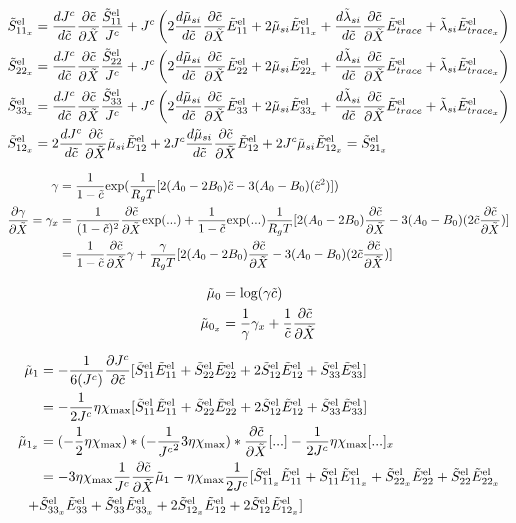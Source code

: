 \documentclass[../main.tex]{subfiles}
\begin{document}
\begin{align}
    \tSel{11_x} &= \djc \tcx \fc{\tSel{11}}{\jc} + \jc \left(  2 \fc{d \td{\mu}_{si}}{d \td c} \tcx \tEel{11} + 2 \td{\mu}_{si} \tEel{11_x} + \fc{d \td {\lambda}_{si}}{d \td {c}} \tcx \tEel{trace} + \td{\lambda}_{si} \tEel{trace_x} \right) \\
    \tSel{22_x} &= \djc \tcx \fc{\tSel{22}}{\jc} + \jc \left(  2 \fc{d \td{\mu}_{si}}{d \td c} \tcx \tEel{22} + 2 \td{\mu}_{si} \tEel{22_x} + \fc{d \td {\lambda}_{si}}{d \td {c}} \tcx \tEel{trace} + \td{\lambda}_{si} \tEel{trace_x} \right) \\
    \tSel{33_x} &= \djc \tcx \fc{\tSel{33}}{\jc} + \jc \left(  2 \fc{d \td{\mu}_{si}}{d \td c} \tcx \tEel{33} + 2 \td{\mu}_{si} \tEel{33_x} + \fc{d \td {\lambda}_{si}}{d \td {c}} \tcx \tEel{trace} + \td{\lambda}_{si} \tEel{trace_x} \right) \\
    \tSel{12_x} &= 2 \djc \tcx \td{\mu}_{si}\tEel{12} + 2 \jc \fc{d\td{\mu}_{si}}{d \tc} \tcx \tEel{12} + 2 \jc \td{\mu}_{si}\tEel{12_x} = \tSel{21_x}
\end{align}

\begin{align}
    \gamma &= \fc{1}{1-\td{c}}\text{exp}(\fc{1}{R_g T}[2(A_0 - 2B_0)\td{c} - 3(A_0 - B_0)(\td{c}^2)])\\
    \pdiff{\gamma}{\tX} = \gamma_x &= \fc{1}{(1-\tc)^2} \tcx \text{exp}(...) + \fc{1}{1-\tc}\text{exp}(...)\fc{1}{R_g T}[2(A_0 - 2B_0)\tcx - 3(A_0 - B_0)(2\tc \tcx)] \\
    &= \fc{1}{1-\tc}\tcx \gamma + \fc{\gamma}{R_g T}[2(A_0 - 2B_0)\tcx - 3(A_0 - B_0)(2\tc \tcx)]\\
\end{align}

\begin{align}
    \td{\mu}_0 &= \text{log}(\gamma \td{c}) \\
    \td{\mu}_{0_x} &= \fc{1}{\gamma}\gamma_x + \fc{1}{\tc}\tcx
\end{align}


\begin{align}
     \td{\mu}_1 &= -\fc{1}{6(\jc)}\pdiff{ \jc}{\tc} [\tSel{11}\tEel{11} + \tSel{22}\tEel{22} + 2\tSel{12}\tEel{12} + \tSel{33}\tEel{33}] \\
    &= -\fc{1}{2\jc}\eta\xmax [\tSel{11}\tEel{11} + \tSel{22}\tEel{22} + 2\tSel{12}\tEel{12} + \tSel{33}\tEel{33}] \\
    \td{\mu}_{1_x} &= (-\fc{1}{2}\eta\xmax)*(-\fc{1}{\jc^2} 3 \eta \xmax)* \tcx [...] -\fc{1}{2\jc}\eta\xmax [...]_x\\
    &= -3\eta\xmax \fc{1}{\jc} \tcx \td{\mu}_{1} - \eta \xmax \fc{1}{2 \jc}[\tSel{11_x}\tEel{11} + \tSel{11}\tEel{11_x} + \tSel{22_x}\tEel{22} + \tSel{22}\tEel{22_x}  \\ +&\tSel{33_x}\tEel{33} + \tSel{33}\tEel{33_x} + 2\tSel{12_x}\tEel{12} + 2\tSel{12}\tEel{12_x}]
\end{align}
\end{document}
